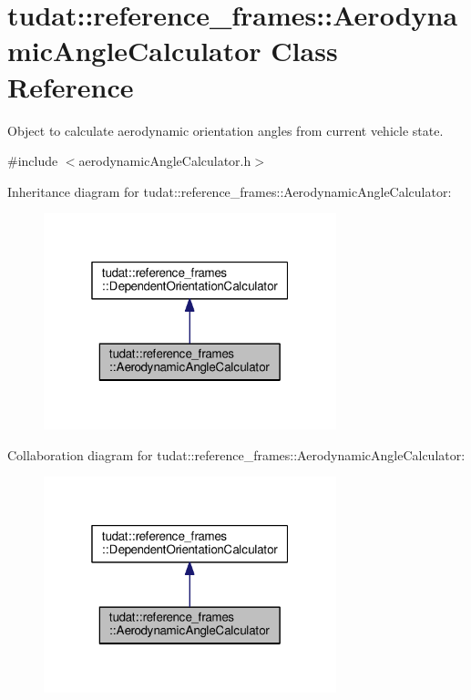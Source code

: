 \hypertarget{classtudat_1_1reference__frames_1_1AerodynamicAngleCalculator}{}\section{tudat\+:\+:reference\+\_\+frames\+:\+:Aerodynamic\+Angle\+Calculator Class Reference}
\label{classtudat_1_1reference__frames_1_1AerodynamicAngleCalculator}


Object to calculate aerodynamic orientation angles from current vehicle state.  




{\ttfamily \#include $<$aerodynamic\+Angle\+Calculator.\+h$>$}



Inheritance diagram for tudat\+:\+:reference\+\_\+frames\+:\+:Aerodynamic\+Angle\+Calculator\+:
\nopagebreak
\begin{figure}[H]
\begin{center}
\leavevmode
\includegraphics[width=241pt]{classtudat_1_1reference__frames_1_1AerodynamicAngleCalculator__inherit__graph}
\end{center}
\end{figure}


Collaboration diagram for tudat\+:\+:reference\+\_\+frames\+:\+:Aerodynamic\+Angle\+Calculator\+:
\nopagebreak
\begin{figure}[H]
\begin{center}
\leavevmode
\includegraphics[width=241pt]{classtudat_1_1reference__frames_1_1AerodynamicAngleCalculator__coll__graph}
\end{center}
\end{figure}
